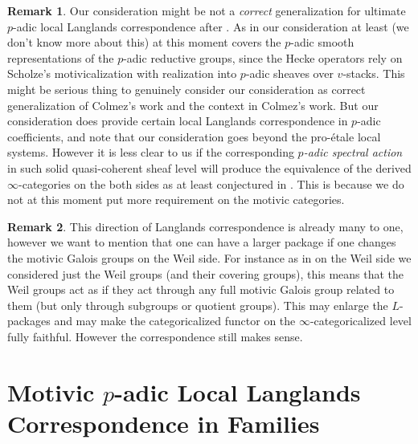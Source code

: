 \documentclass[12pt]{article}
\theoremstyle{definition}
\newtheorem{remark}{Remark}
\begin{document}
\begin{remark}
Our consideration might be not a \textit{correct} generalization for ultimate $p$-adic local Langlands correspondence after \cite{C}. As in \cite{EGH1} our consideration at least (we don't know more about this) at this moment covers the $p$-adic smooth representations of the $p$-adic reductive groups, since the Hecke operators rely on Scholze's motivicalization with realization into $p$-adic sheaves over $v$-stacks. This might be serious thing to genuinely consider our consideration as correct generalization of Colmez's work and the context in Colmez's work. But our consideration does provide certain local Langlands correspondence in $p$-adic coefficients, and note that our consideration goes beyond the pro-\'etale local systems. However it is less clear to us if the corresponding \textit{$p$-adic spectral action} in such solid quasi-coherent sheaf level will produce the equivalence of the derived $\infty$-categories on the both sides as at least conjectured in \cite{1FS}. This is because we do not at this moment put more requirement on the motivic categories.
\end{remark}


\begin{remark}
This direction of Langlands correspondence is already many to one, however we want to mention that one can have a larger package if one changes the motivic Galois groups on the Weil side. For instance as in \cite{1T} on the Weil side we considered just the Weil groups (and their covering groups), this means that the Weil groups act as if they act through any full motivic Galois group related to them (but only through subgroups or quotient groups). This may enlarge the $L$-packages and may make the categoricalized functor on the $\infty$-categoricalized level fully faithful. However the correspondence still makes sense.
\end{remark}




\newpage
\section{Motivic $p$-adic Local Langlands Correspondence in Families}
\end{document}
